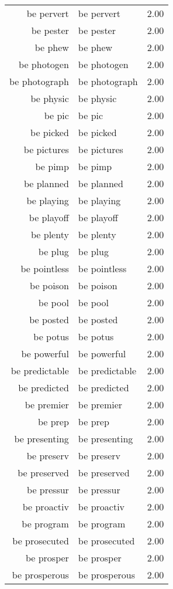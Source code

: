 \begin{table}[ht]
\begin{tabular}{rlr}
  be pervert & be pervert & 2.00 \\ 
  be pester & be pester & 2.00 \\ 
  be phew & be phew & 2.00 \\ 
  be photogen & be photogen & 2.00 \\ 
  be photograph & be photograph & 2.00 \\ 
  be physic & be physic & 2.00 \\ 
  be pic & be pic & 2.00 \\ 
  be picked & be picked & 2.00 \\ 
  be pictures & be pictures & 2.00 \\ 
  be pimp & be pimp & 2.00 \\ 
  be planned & be planned & 2.00 \\ 
  be playing & be playing & 2.00 \\ 
  be playoff & be playoff & 2.00 \\ 
  be plenty & be plenty & 2.00 \\ 
  be plug & be plug & 2.00 \\ 
  be pointless & be pointless & 2.00 \\ 
  be poison & be poison & 2.00 \\ 
  be pool & be pool & 2.00 \\ 
  be posted & be posted & 2.00 \\ 
  be potus & be potus & 2.00 \\ 
  be powerful & be powerful & 2.00 \\ 
  be predictable & be predictable & 2.00 \\ 
  be predicted & be predicted & 2.00 \\ 
  be premier & be premier & 2.00 \\ 
  be prep & be prep & 2.00 \\ 
  be presenting & be presenting & 2.00 \\ 
  be preserv & be preserv & 2.00 \\ 
  be preserved & be preserved & 2.00 \\ 
  be pressur & be pressur & 2.00 \\ 
  be proactiv & be proactiv & 2.00 \\ 
  be program & be program & 2.00 \\ 
  be prosecuted & be prosecuted & 2.00 \\ 
  be prosper & be prosper & 2.00 \\ 
  be prosperous & be prosperous & 2.00 \\ 

\end{tabular}
\end{table}

